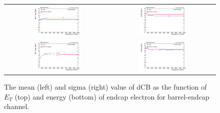 \begin{figure}[ht]
  \begin{center}
    \begin{tabular}{cc}
      \includegraphics[width=0.48\textwidth]{figures/Zprime/2017/mass_resolution/scale_check/h_endcap_Et_Mee_BE_scale} &
      \includegraphics[width=0.48\textwidth]{figures/Zprime/2017/mass_resolution/scale_check/h_endcap_Et_Mee_BE_resolution} \\
      \includegraphics[width=0.48\textwidth]{figures/Zprime/2017/mass_resolution/scale_check/h_endcap_E_Mee_BE_scale} &
      \includegraphics[width=0.48\textwidth]{figures/Zprime/2017/mass_resolution/scale_check/h_endcap_E_Mee_BE_resolution}
    \end{tabular}
    \caption{The mean (left) and sigma (right) value of dCB as the function of $E_{T}$ (top) and energy (bottom) of endcap electron for barrel-endcap channel.
    \label{fig:data_MC_Et_E_BE}}
  \end{center}
\end{figure}

